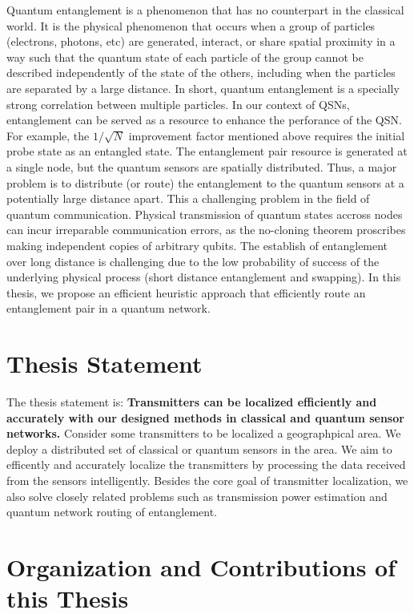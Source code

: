 Quantum entanglement is a phenomenon that has no counterpart in the classical world.
It is the physical phenomenon that occurs when a group of particles (electrons, photons, etc) are generated, interact, or share spatial proximity in a way such that
the quantum state of each particle of the group cannot be described independently of the state of the others, including when the particles
are separated by a large distance.
In short, quantum entanglement is a specially strong correlation between multiple particles.
In our context of QSNs, entanglement can be served as a resource to enhance the perforance of the QSN.
For example, the $1 / \sqrt{N}$ improvement factor mentioned above requires the initial probe state as an entangled state.
The entanglement pair resource is generated at a single node, but the quantum sensors are spatially distributed.
Thus, a major problem is to distribute (or route) the entanglement to the quantum sensors at a potentially large distance apart.
This a challenging problem in the field of quantum communication.
Physical transmission of quantum states accross nodes can incur irreparable communication errors, as the no-cloning theorem proscribes
making independent copies of arbitrary qubits.
The establish of entanglement over long distance is challenging due to the low probability of success of the underlying physical process
(short distance entanglement and swapping).
In this thesis, we propose an efficient heuristic approach that efficiently route an entanglement pair in a quantum network.


\section{Thesis Statement}

The thesis statement is: \textbf{Transmitters can be localized efficiently and accurately with our designed methods in classical and quantum sensor networks.} 
Consider some transmitters to be localized a geographpical area. We deploy a distributed set of classical or quantum sensors in the area.
We aim to efficently and accurately localize the transmitters by processing the data received from the sensors intelligently.
Besides the core goal of transmitter localization, we also solve closely related problems such as transmission power estimation
and quantum network routing of entanglement.

\section{Organization and Contributions of this Thesis}

